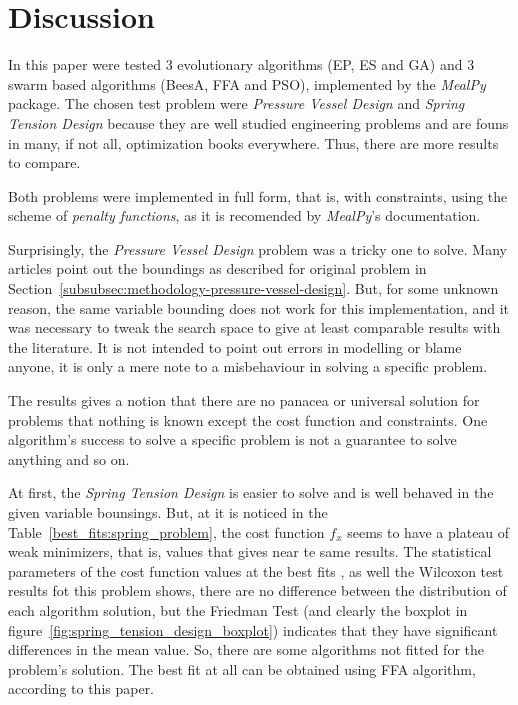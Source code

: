 

\section{Discussion}

In this paper were tested 3 evolutionary algorithms (EP, ES and GA) and 3
swarm based algorithms (BeesA, FFA and PSO), implemented by the \textit{MealPy}
package. The chosen test problem were \textit{Pressure Vessel Design} and
\textit{Spring Tension Design} because they are well studied engineering problems
and are founs in many, if not all, optimization books everywhere. Thus, there are
more results to compare.

Both problems were implemented in full form, that is, with constraints, using the scheme of
\textit{penalty functions}, as it is recomended by \textit{MealPy}'s documentation.

Surprisingly, the \textit{Pressure Vessel Design} problem was a tricky one to solve.
Many articles point out the boundings as described for original problem
in Section~\ref{subsubsec:methodology-pressure-vessel-design}.
But, for some unknown reason, the same variable bounding does not work for this
implementation, and it was necessary to tweak the search space to give at least
comparable results with the literature.
It is not intended to point out errors in modelling or blame anyone, it is only a mere
note to a misbehaviour in solving a specific problem.

The results gives a notion that there are no panacea or universal solution for problems that
nothing is known except the cost function and constraints.
One algorithm's success to solve a specific problem is not a guarantee to solve anything
and so on.

At first, the \textit{Spring Tension Design} is easier to solve and is well behaved in the
given variable bounsings. But, at it is noticed in the Table~\ref{best_fits:spring_problem},
the cost function $f_x$ seems to have a plateau of weak minimizers, that is, values that gives
near te same results. The statistical parameters of the cost function values at the best fits
, as well the Wilcoxon test results fot this problem shows, there are no difference between the
distribution of each algorithm solution, but the Friedman Test (and clearly the boxplot in
figure~\ref{fig:spring_tension_design_boxplot}) indicates that they have significant
differences in the mean value. So, there are some algorithms not fitted for the problem's solution.
The best fit at all can be obtained using FFA algorithm, according to this paper.

